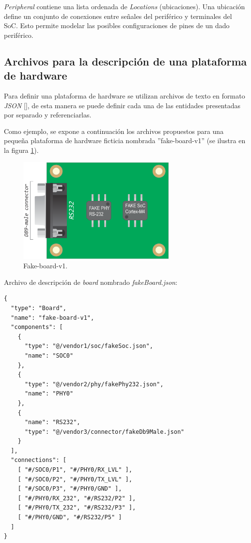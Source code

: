 \emph{Peripheral} contiene una lista ordenada de \emph{Locations} (ubicaciones). Una ubicación define un conjunto de conexiones entre señales del periférico y terminales del SoC. Esto permite modelar las posibles configuraciones de pines de un dado periférico.

\subsection{Archivos para la descripción de una plataforma de hardware}

Para definir una plataforma de hardware se utilizan archivos de texto en formato \emph{JSON} [], de esta manera se puede definir cada una de las entidades presentadas por separado y referenciarlas. 

Como ejemplo, se expone a continuación los archivos propuestos para una pequeña plataforma de hardware ficticia nombrada ''fake-board-v1'' (se ilustra en la figura \ref{fig:fakeBoard}). 

\begin{figure}[!htbp]
\begin{center}  %
\includegraphics*[width=8cm]{Figures/FakeBoard-01.pdf}
\par\caption{Fake-board-v1.}\label{fig:fakeBoard}
\end{center}
\end{figure}

Archivo de descripción de \emph{board} nombrado \emph{fakeBoard.json}:

\begin{verbatim}
{
  "type": "Board",
  "name": "fake-board-v1",
  "components": [
    {
      "type": "@/vendor1/soc/fakeSoc.json",
      "name": "SOC0"
    },
    {
      "type": "@/vendor2/phy/fakePhy232.json",
      "name": "PHY0"
    },
    {
      "name": "RS232",
      "type": "@/vendor3/connector/fakeDb9Male.json"
    }
  ],
  "connections": [
    [ "#/SOC0/P1", "#/PHY0/RX_LVL" ],
    [ "#/SOC0/P2", "#/PHY0/TX_LVL" ],
    [ "#/SOC0/P3", "#/PHY0/GND" ],
    [ "#/PHY0/RX_232", "#/RS232/P2" ],
    [ "#/PHY0/TX_232", "#/RS232/P3" ],
    [ "#/PHY0/GND", "#/RS232/P5" ]
  ]
}
\end{verbatim}

